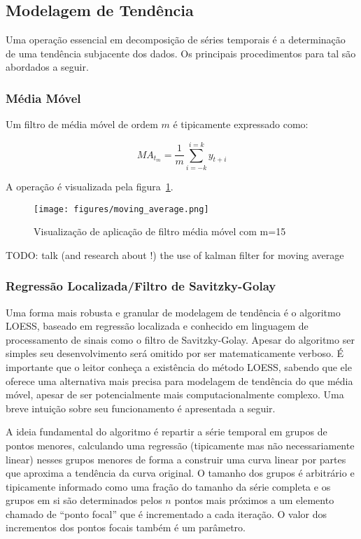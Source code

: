 \subsection{Modelagem de Tendência}

Uma operação essencial em decomposição de séries temporais é a determinação
de uma tendência subjacente dos dados. Os principais procedimentos para tal
são abordados a seguir.

\subsubsection{Média Móvel}\label{sssec:MA(p)}

Um filtro de média móvel de ordem $m$ é tipicamente expressado como:

\begin{equation}\label{eq:ma}
    MA_{t_{m}} = \frac{1}{m} \sum_{i=-k}^{i=k} y_{t+i}
\end{equation}

A operação é visualizada pela figura~\ref{fig:MA}.

\begin{figure}[H]
    \centering
    \texttt{[image: figures/moving\_average.png]}
    \caption{Visualização de aplicação de filtro média móvel com m=15}
    \label{fig:MA}
\end{figure}

TODO: talk (and research about !) the use of kalman filter for moving average

\subsubsection{Regressão Localizada/Filtro de Savitzky-Golay}

Uma forma mais robusta e granular de modelagem de tendência é o algoritmo
LOESS, baseado em regressão localizada e conhecido em linguagem de processamento
de sinais como o filtro de Savitzky-Golay. Apesar do algoritmo ser simples
seu desenvolvimento será omitido por ser matematicamente verboso. É importante
que o leitor conheça a existência do método LOESS, sabendo que ele oferece uma
alternativa mais precisa para modelagem de tendência do que média móvel,
apesar de ser potencialmente mais computacionalmente complexo. Uma breve
intuição sobre seu funcionamento é apresentada a seguir.

A ideia fundamental do algoritmo é repartir a série temporal em grupos de
pontos menores, calculando uma regressão (tipicamente mas não necessariamente
linear) nesses grupos menores de forma a construir uma curva linear por partes
que aproxima a tendência da curva original. O tamanho dos grupos é arbitrário
e tipicamente informado como uma fração do tamanho da série completa e os grupos
em si são determinados pelos $n$ pontos mais próximos a um elemento chamado de
``ponto focal'' que é incrementado a cada iteração. O valor dos incrementos dos
pontos focais também é um parâmetro.

